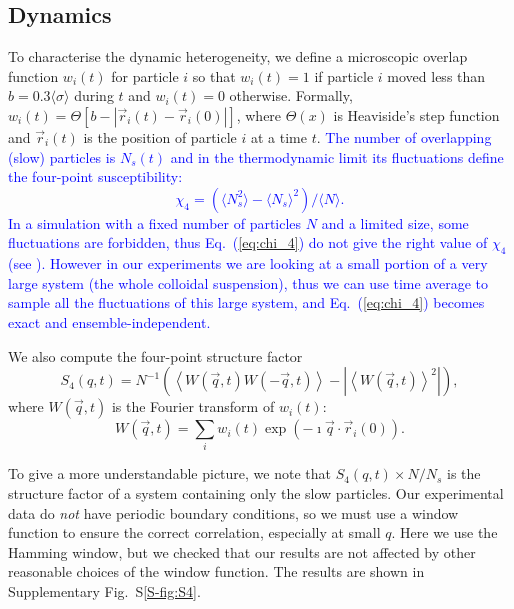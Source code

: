 \subsection*{Dynamics}

To characterise the dynamic heterogeneity, we define a microscopic overlap function $w_i(t)$ for particle $i$ so that $w_i(t)=1$ if particle $i$ moved less than $b=0.3\langle\sigma\rangle$ during $t$ and $w_i(t)=0$ otherwise. 
Formally, $w_i(t) = \Theta [b - |\vec{r}_i(t) - \vec{r}_i(0)|]$, where $\Theta(x)$ is Heaviside’s step function and $\vec{r}_i(t)$ is the position
of particle $i$ at a time $t$.
\textcolor{blue}{The number of overlapping (slow) particles is $N_s(t)$ and in the thermodynamic limit its fluctuations define the four-point susceptibility:
\begin{equation}
\chi_4 = (\langle N_s^2\rangle - \langle N_s\rangle^2) /  \langle N\rangle. 
\label{eq:chi_4}
\end{equation}}
\textcolor{blue}{In a simulation with a fixed number of particles $N$ and a limited size, some fluctuations are forbidden, thus Eq.~(\ref{eq:chi_4}) do not give the right value of $\chi_4$ (see \citep{Flenner2011}). However in our experiments we are looking at a small portion of a very large system (the whole colloidal suspension), thus we can use time average to sample all the fluctuations of this large system, and Eq.~(\ref{eq:chi_4}) becomes exact and ensemble-independent.}

We also compute the four-point structure factor~\cite{Flenner2011}
\begin{equation}
	S_4(q,t) = N^{-1}(\left\langle W(\vec{q},t) W(-\vec{q},t) \right\rangle - | \left\langle W(\vec{q},t) \right\rangle^2 |),   
	\label{eq:S4}
\end{equation}
where $W(\vec{q},t)$ is the Fourier transform of $w_i(t)$: 
\begin{equation}
	W(\vec{q},t) = \sum_i w_i(t)\exp(-\imath \vec{q}\cdot\vec{r}_i(0)).  
\end{equation}


To give a more understandable picture, we note that $S_4(q,t)\times N/N_s$ is the structure factor of a system containing only the slow particles. Our experimental data do \emph{not} have periodic boundary conditions, so we must use a window function to ensure the correct correlation, especially at small $q$. Here we use the Hamming window, but we checked that our results are not affected by other reasonable choices of the window function. The results are shown in Supplementary Fig.~S\ref{S-fig:S4}.

